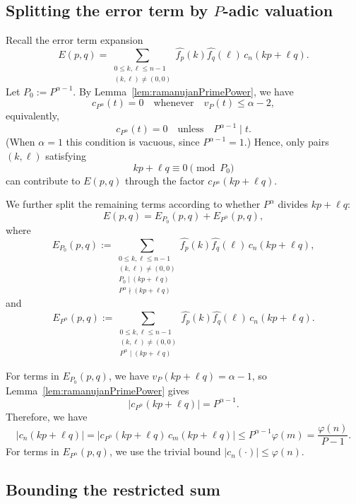 \documentclass[12pt]{amsart}
\begin{document}
\subsection{Splitting the error term by {$P$}-adic valuation}\label{Subsection5.1}

Recall the error term expansion
\[
E(p,q)=\sum_{\substack{0\le k,\ell\le n-1\\ (k,\ell)\ne (0,0)}}\widehat{f_p}(k)\widehat{f_q}(\ell)\,c_n(kp+\ell q).
\]
Let $P_0:=P^{\alpha-1}$. By Lemma~\ref{lem:ramanujanPrimePower}, we have
\[
c_{P^\alpha}(t)=0 \quad\text{whenever}\quad v_P(t)\le \alpha-2,
\]
equivalently,
\[
c_{P^\alpha}(t)=0 \quad\text{unless}\quad P^{\alpha-1}\mid t.
\]
(When $\alpha=1$ this condition is vacuous, since $P^{\alpha-1}=1$.)
Hence, only pairs $(k,\ell)$ satisfying
\begin{equation}\label{eq:congP0}
kp+\ell q \equiv 0 \pmod{P_0}
\end{equation}
can contribute to $E(p,q)$ through the factor $c_{P^\alpha}(kp+\ell q)$.


We further split the remaining terms according to whether $P^{\alpha}$ divides $kp+\ell q$:
\[
E(p,q)=E_{P_0}(p,q)+E_{P^{\alpha}}(p,q),
\]
where
\[
E_{P_0}(p,q):=\sum_{\substack{0\le k,\ell\le n-1\\ (k,\ell)\ne (0,0)\\ P_0\mid (kp+\ell q)\\ P^{\alpha}\nmid (kp+\ell q)}}\widehat{f_p}(k)\widehat{f_q}(\ell)\,c_n(kp+\ell q),
\]
and
\[
E_{P^{\alpha}}(p,q):=\sum_{\substack{0\le k,\ell\le n-1\\ (k,\ell)\ne (0,0)\\ P^{\alpha}\mid (kp+\ell q)}}\widehat{f_p}(k)\widehat{f_q}(\ell)\,c_n(kp+\ell q).
\]

For terms in $E_{P_0}(p,q)$, we have $v_P(kp+\ell q)=\alpha-1$, so Lemma~\ref{lem:ramanujanPrimePower} gives 
$$|c_{P^{\alpha}}(kp+\ell q)|=P^{\alpha-1}.
$$
Therefore, we have
\begin{equation}\label{eq:cnBoundLow}
|c_n(kp+\ell q)|=|c_{P^{\alpha}}(kp+\ell q)\,c_m(kp+\ell q)|\le P^{\alpha-1}\varphi(m)=\frac{\varphi(n)}{P-1}.
\end{equation}
For terms in $E_{P^{\alpha}}(p,q)$, we use the trivial bound $|c_n(\cdot)|\le \varphi(n)$.

\subsection{Bounding the restricted sum}\label{Subsection5.2}
\end{document}
